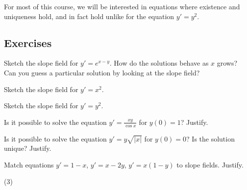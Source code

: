 For most of this
course, we will be interested in equations where existence and
uniqueness hold, and in fact hold  unlike for the equation
$y'=y^2$.

\subsection{Exercises}

\begin{exercise}
Sketch the slope field for $y'=e^{x-y}$.  How do the solutions behave as $x$
grows?  Can you guess a particular solution by looking at the slope
field?
\end{exercise}

\begin{exercise}
Sketch the slope field for $y'=x^2$.
\end{exercise}

\begin{exercise}
Sketch the slope field for $y'=y^2$.
\end{exercise}

\begin{exercise}
Is it possible to solve the equation $y' = \frac{xy}{\cos x}$ for $y(0) = 1$?
Justify.
\end{exercise}

\begin{exercise}
Is it possible to solve the equation $y' = y\sqrt{\lvert x\rvert}$ for
$y(0) = 0$?  Is the solution unique?
Justify.
\end{exercise}

\begin{samepage}
\begin{exercise}
Match equations $y'=1-x$, $y'=x-2y$, $y' = x(1-y)$ to slope fields.
Justify.
\begin{tasks}(3)
\task
\parbox[c]{1.75in}{}
\task
\parbox[c]{1.75in}{}
\task
\parbox[c]{1.75in}{}
\end{tasks}
\end{exercise}
\end{samepage}

